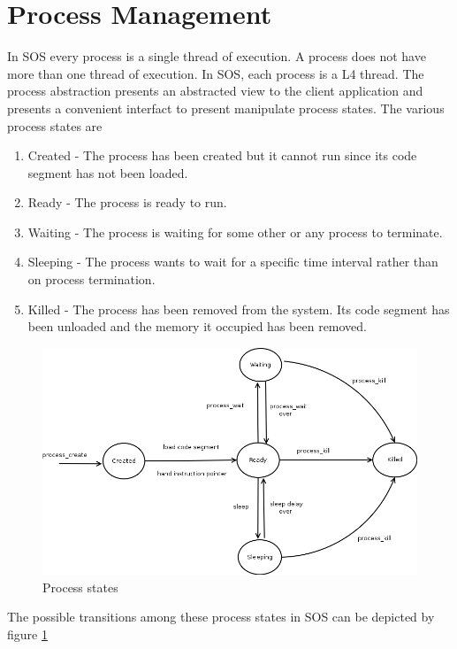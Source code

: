 \documentclass[a4paper, 11pt]{article}
\begin{document}
\section{Process Management}
In SOS every process is a single thread of execution. A process does
not have more than one thread of execution. In SOS, each process is a
L4 thread. The process abstraction presents an abstracted view to the
client application and presents a convenient interfact to present
manipulate process states. The various process states are
\begin{enumerate}
\item Created - The process has been created but it cannot run since
  its code segment has not been loaded.
\item Ready - The process is ready to run.
\item Waiting - The process is waiting for some other or any process
  to terminate.
\item Sleeping - The process wants to wait for a specific time
  interval rather than on process termination.
\item Killed - The process has been removed from the system. Its code
  segment has been unloaded and the memory it occupied has been
  removed.
\end{enumerate}

\begin{figure}
\begin{center}
\includegraphics[scale=0.5]{process-states.png}
\end{center}
\caption{Process states}
\label{process-states-fig}
\end{figure}

The possible transitions among these process states in SOS can be
depicted by figure \ref{process-states-fig}

\newpage


\end{document}
